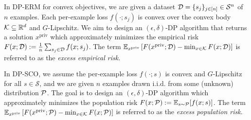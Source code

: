 In DP-ERM for convex objectives, we are given a dataset $\mathcal D=\{s_{j}\}_{j\in[n]} \in \mathcal{S}^n$ of $n$ examples. 
Each per-example loss $f(\cdot ; s_j)$ is convex over the convex body $\mathcal K\subseteq\mathbb{R}^{d}$ and $G$-Lipschitz.
We aim to design an $(\epsilon,\delta)$-DP algorithm that returns a solution $x^\text{priv}$ which approximately minimizes the empirical risk $F(x;\mathcal D):=\frac{1}{n}\sum_{s_{j}\in \mathcal D}f(x;s_{j})$.
The term $\mathbb{E}_{x^\text{priv}} \left[ F(x^\text{priv};\mathcal D)-\min_{x\in\mathcal K}F(x;\mathcal D) \right]$ is referred to as the \emph{excess empirical risk}.

In DP-SCO, we assume the per-example loss $f(\cdot;s)$ is convex and $G$-Lipschitz for all $s\in \mathcal{S}$, and we are given $n$ examples drawn i.i.d. from some (unknown) distribution $\mathcal P$.
The goal is to design an $(\epsilon,\delta)$-DP algorithm which approximately minimizes the population risk
$F(x;\mathcal P):=\mathbb{E}_{s\sim\mathcal P} [ f(x;s) ]$.
The term $\mathbb{E}_{x^\text{priv}} \left[ F(x^\text{priv} ; \mathcal P)-\min_{x\in\mathcal K}F(x;\mathcal P) \right]$ is referred to as the \emph{excess population risk}.

